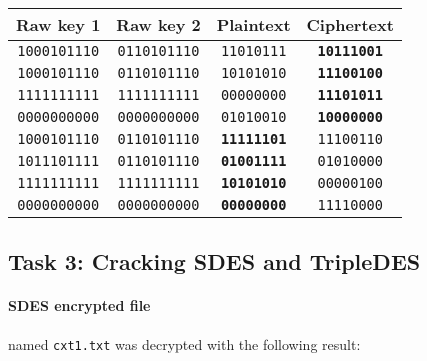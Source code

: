 \documentclass[a4paper,english,12pt]{article}
\begin{document}
\begin{table}[H]
  \centering
  \begin{tabular}{cccc}
    \hline 
      \textbf{Raw key 1} &
      \textbf{Raw key 2} &
      \textbf{Plaintext} &
      \textbf{Ciphertext} \\
    \hline

             \texttt{1000101110} &
             \texttt{0110101110} &
               \texttt{11010111} &
       \texttt{\textbf{10111001}} \\

            \texttt{1000101110} &
            \texttt{0110101110} &
              \texttt{10101010} &
      \texttt{\textbf{11100100}} \\

            \texttt{1111111111} &
            \texttt{1111111111} &
              \texttt{00000000} &
      \texttt{\textbf{11101011}} \\

            \texttt{0000000000} &
            \texttt{0000000000} &
              \texttt{01010010} &
      \texttt{\textbf{10000000}} \\

            \texttt{1000101110} &
            \texttt{0110101110} &
      \texttt{\textbf{11111101}} &
              \texttt{11100110} \\

             \texttt{1011101111} &
             \texttt{0110101110} &
       \texttt{\textbf{01001111}} &
               \texttt{01010000} \\

            \texttt{1111111111} &
            \texttt{1111111111} &
      \texttt{\textbf{10101010}} &
              \texttt{00000100} \\

            \texttt{0000000000} &
            \texttt{0000000000} &
      \texttt{\textbf{00000000}} &
              \texttt{11110000} \\

      \hline
  \end{tabular}
  \label{table:task2}
\end{table}

\subsection{Task 3: Cracking SDES and TripleDES}

\paragraph{SDES encrypted file} named \texttt{cxt1.txt} was decrypted with the
following result:
\end{document}
